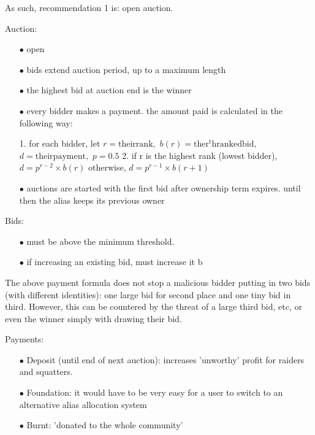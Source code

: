\documentclass[10pt,a4paper]{article}
\begin{document}
{As such, recommendation 1 is: open auction.

Auction:

\begin{enumerate}
\item[$\bullet$] open
\item[$\bullet$] bids extend auction period, up to a maximum length
\item[$\bullet$] the highest bid at auction end is the winner
\item[$\bullet$] every bidder makes a payment. the amount paid is calculated in the following way:

	1. for each bidder, let 
		$r = \mathrm{their rank},$
		$b(r) = \mathrm{the r^th ranked bid},$
		$d = \mathrm{their payment},$
		$p = 0.5$
	2. if r is the highest rank (\ie lowest bidder),
		$d = p^{r - 2} \times b(r)$
	   otherwise, 
		$d = p^{r - 1} \times b(r + 1)$
		
\item[$\bullet$] auctions are started with the first bid after ownership term expires. until then the alias keeps its previous owner 
\end{enumerate}

Bids:

\begin{enumerate}
\item[$\bullet$] must be above the minimum threshold.
\item[$\bullet$] if increasing an existing bid, must increase it b
\end{enumerate}

The above payment formula does not stop a malicious bidder putting in two bids (with different identities): one large bid for second place and one tiny bid in third. However, this can be countered by the threat of a large third bid, etc, or even the winner simply with drawing their bid.



Payments:

\begin{enumerate}
\item[$\bullet$] Deposit (until end of next auction): increases 'unworthy' profit for raiders and squatters.
\item[$\bullet$] Foundation: it would have to be very easy for a user to switch to an alternative alias allocation system
\item[$\bullet$] Burnt: 'donated to the whole community'
\end{enumerate}

}
\end{document}
